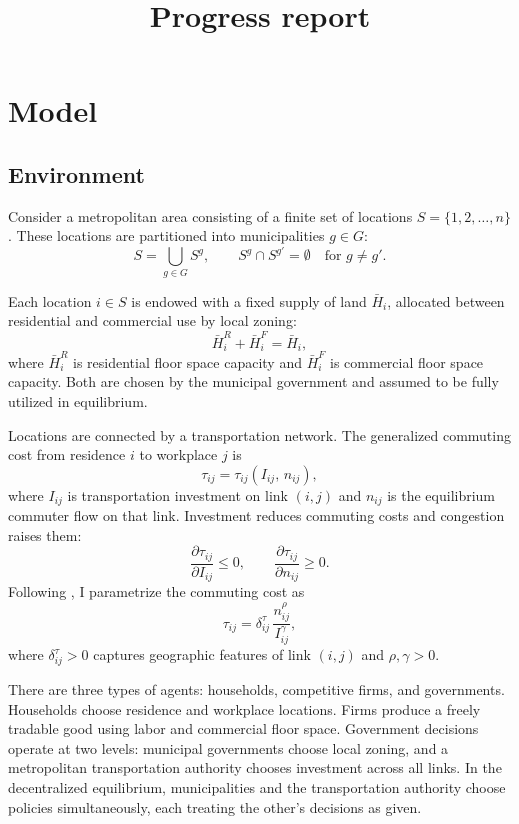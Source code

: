 \documentclass[12pt, a4paper]{article}
\title{Progress report}
\author{}
\date{}
\theoremstyle{definition}
\begin{document}
\maketitle

\section{Model}

\subsection{Environment}

Consider a metropolitan area consisting of a finite set of locations $S = \{1, 2, \ldots, n\}$. These locations are partitioned into municipalities $g \in G$:
\[
S = \bigcup_{g \in G} S^g, \qquad S^g \cap S^{g'} = \emptyset \quad \text{for } g \neq g'.
\]

Each location $i \in S$ is endowed with a fixed supply of land $\bar{H}_i$, allocated between residential and commercial use by local zoning:
\[
\bar{H}_i^R + \bar{H}_i^F = \bar{H}_i,
\]
where $\bar{H}_i^R$ is residential floor space capacity and $\bar{H}_i^F$ is commercial floor space capacity. Both are chosen by the municipal government and assumed to be fully utilized in equilibrium.

Locations are connected by a transportation network. The generalized commuting cost from residence $i$ to workplace $j$ is
\[
\tau_{ij} = \tau_{ij}(I_{ij},\, n_{ij}),
\]
where $I_{ij}$ is transportation investment on link $(i,j)$ and $n_{ij}$ is the equilibrium commuter flow on that link. Investment reduces commuting costs and congestion raises them:
\[
\frac{\partial \tau_{ij}}{\partial I_{ij}} \leq 0, \qquad \frac{\partial \tau_{ij}}{\partial n_{ij}} \geq 0.
\]
Following \cite{Fajgelbaum2020-yv}, I parametrize the commuting cost as
\[
\tau_{ij} = \delta_{ij}^{\tau}\, \frac{n_{ij}^{\rho}}{I_{ij}^{\gamma}},
\]
where $\delta_{ij}^{\tau} > 0$ captures geographic features of link $(i,j)$ and $\rho, \gamma > 0$.

There are three types of agents: households, competitive firms, and governments. Households choose residence and workplace locations. Firms produce a freely tradable good using labor and commercial floor space. Government decisions operate at two levels: municipal governments choose local zoning, and a metropolitan transportation authority chooses investment across all links. In the decentralized equilibrium, municipalities and the transportation authority choose policies simultaneously, each treating the other's decisions as given.
\end{document}

